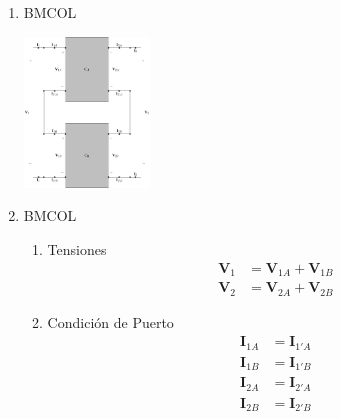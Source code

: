 \begin{enumerate}
\item \hfill{}\textsc{BMCOL}
\label{sec:orgfbc403e}
\begin{center}
\includegraphics[height=4cm]{../figs/serie-serie.pdf}
\end{center}



\item \hfill{}\textsc{BMCOL}
\label{sec:orgb817874}
\begin{enumerate}
\item Tensiones
\label{sec:orgbdd8729}
\begin{align*}
  \mathbf{V}_1 &= \mathbf{V}_{1A} + \mathbf{V}_{1B}\\
  \mathbf{V}_2 &= \mathbf{V}_{2A} + \mathbf{V}_{2B}
\end{align*}

\item Condición de Puerto
\label{sec:org70529d0}
\begin{align*}
  \mathbf{I}_{1A} &= \mathbf{I}_{1'A}\\
  \mathbf{I}_{1B} &= \mathbf{I}_{1'B}\\
  \mathbf{I}_{2A} &= \mathbf{I}_{2'A}\\
  \mathbf{I}_{2B} &= \mathbf{I}_{2'B}
\end{align*}
\end{enumerate}
\end{enumerate}

